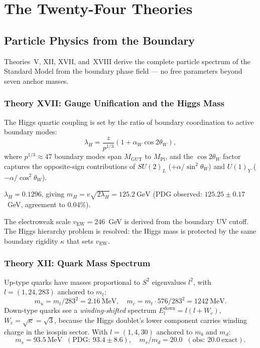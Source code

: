 \documentclass[12pt,oneside]{book}
\theoremstyle{definition}
\begin{document}
\part{The Twenty-Four Theories}

\chapter{Particle Physics from the Boundary}
\label{chap:particles}

Theories~V, XII, XVII, and~XVIII derive the complete particle spectrum of the
Standard Model from the boundary phase field --- no free parameters beyond seven
anchor masses.

\section{Theory XVII: Gauge Unification and the Higgs Mass}

The Higgs quartic coupling is set by the ratio of boundary coordination to active
boundary modes:
\begin{equation}
  \lambda_H = \frac{z}{p^{1/3}}\!\left(1 + \alpha_W\cos 2\theta_W\right),
\end{equation}
where $p^{1/3}\approx 47$ boundary modes span $M_{\mathrm{GUT}}$ to $M_{\mathrm{Pl}}$,
and the $\cos 2\theta_W$ factor captures the opposite-sign contributions of
$SU(2)_L$ ($+\alpha/\sin^2\theta_W$) and $U(1)_Y$ ($-\alpha/\cos^2\theta_W$).

\begin{prediction}
$\lambda_H = 0.1296$, giving
$m_H = v\sqrt{2\lambda_H} = \mathbf{125.2~\mathrm{GeV}}$
\quad (PDG observed: $125.25 \pm 0.17$~GeV, agreement to $0.04\%$).
\end{prediction}

The electroweak scale $v_{\mathrm{EW}} = 246$~GeV is derived from the boundary
UV cutoff. The Higgs hierarchy problem is resolved: the Higgs mass is protected
by the same boundary rigidity $\kappa$ that sets $v_{\mathrm{EW}}$.

\section{Theory XII: Quark Mass Spectrum}

Up-type quarks have masses proportional to $S^2$ eigenvalues $l^2$, with
$l = (1, 24, 283)$ anchored to $m_t$:
\begin{equation}
  m_u = m_t/283^2 = 2.16~\mathrm{MeV}, \quad
  m_c = m_t \cdot 576/283^2 = 1242~\mathrm{MeV}.
\end{equation}
Down-type quarks see a \textit{winding-shifted} spectrum
$E_l^{\mathrm{down}} = l(l + W_c)$, $W_c = \sqrt{\kappa} = \sqrt{3}$,
because the Higgs doublet's lower component carries winding charge in the
isospin sector. With $l = (1, 4, 30)$ anchored to $m_b$ and $m_d$:
\begin{equation}
  m_s = 93.5~\mathrm{MeV} \;\;(\mathrm{PDG:}~93.4\pm 8.6),
  \quad m_s/m_d = 20.0 \;\;(\mathrm{obs:}~20.0~\text{exact}).
\end{equation}
\end{document}
